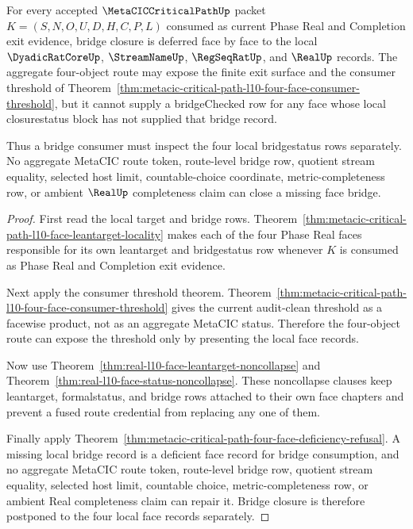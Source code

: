 \begin{theorem}
\label{thm:metacic-critical-path-l10-four-face-bridge-deferral}
For every accepted $\MetaCICCriticalPathUp$ packet $K=(S,N,O,U,D,H,C,P,L)$ consumed as current Phase Real and Completion exit evidence, bridge closure is deferred face by face to the local $\DyadicRatCoreUp$, $\StreamNameUp$, $\RegSeqRatUp$, and $\RealUp$ records. The aggregate four-object route may expose the finite exit surface and the consumer threshold of Theorem~\ref{thm:metacic-critical-path-l10-four-face-consumer-threshold}, but it cannot supply a bridgeChecked row for any face whose local closurestatus block has not supplied that bridge record.

Thus a bridge consumer must inspect the four local bridgestatus rows separately. No aggregate MetaCIC route token, route-level bridge row, quotient stream equality, selected host limit, countable-choice coordinate, metric-completeness row, or ambient $\RealUp$ completeness claim can close a missing face bridge.
\end{theorem}
\begin{proof}
First read the local target and bridge rows. Theorem~\ref{thm:metacic-critical-path-l10-face-leantarget-locality} makes each of the four Phase Real faces responsible for its own leantarget and bridgestatus row whenever $K$ is consumed as Phase Real and Completion exit evidence.

Next apply the consumer threshold theorem. Theorem~\ref{thm:metacic-critical-path-l10-four-face-consumer-threshold} gives the current audit-clean threshold as a facewise product, not as an aggregate MetaCIC status. Therefore the four-object route can expose the threshold only by presenting the local face records.

Now use Theorem~\ref{thm:real-l10-face-leantarget-noncollapse} and Theorem~\ref{thm:real-l10-face-status-noncollapse}. These noncollapse clauses keep leantarget, formalstatus, and bridge rows attached to their own face chapters and prevent a fused route credential from replacing any one of them.

Finally apply Theorem~\ref{thm:metacic-critical-path-four-face-deficiency-refusal}. A missing local bridge record is a deficient face record for bridge consumption, and no aggregate MetaCIC route token, route-level bridge row, quotient stream equality, selected host limit, countable choice, metric-completeness row, or ambient Real completeness claim can repair it. Bridge closure is therefore postponed to the four local face records separately.
\end{proof}

